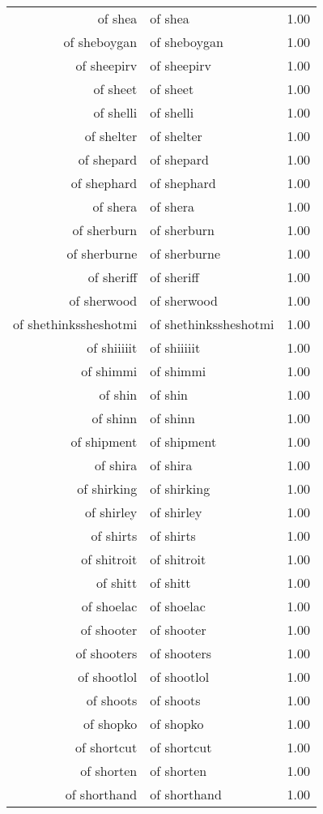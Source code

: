 \begin{table}[ht]
\begin{tabular}{rlr}
  of shea & of shea & 1.00 \\ 
  of sheboygan & of sheboygan & 1.00 \\ 
  of sheepirv & of sheepirv & 1.00 \\ 
  of sheet & of sheet & 1.00 \\ 
  of shelli & of shelli & 1.00 \\ 
  of shelter & of shelter & 1.00 \\ 
  of shepard & of shepard & 1.00 \\ 
  of shephard & of shephard & 1.00 \\ 
  of shera & of shera & 1.00 \\ 
  of sherburn & of sherburn & 1.00 \\ 
  of sherburne & of sherburne & 1.00 \\ 
  of sheriff & of sheriff & 1.00 \\ 
  of sherwood & of sherwood & 1.00 \\ 
  of shethinkssheshotmi & of shethinkssheshotmi & 1.00 \\ 
  of shiiiiit & of shiiiiit & 1.00 \\ 
  of shimmi & of shimmi & 1.00 \\ 
  of shin & of shin & 1.00 \\ 
  of shinn & of shinn & 1.00 \\ 
  of shipment & of shipment & 1.00 \\ 
  of shira & of shira & 1.00 \\ 
  of shirking & of shirking & 1.00 \\ 
  of shirley & of shirley & 1.00 \\ 
  of shirts & of shirts & 1.00 \\ 
  of shitroit & of shitroit & 1.00 \\ 
  of shitt & of shitt & 1.00 \\ 
  of shoelac & of shoelac & 1.00 \\ 
  of shooter & of shooter & 1.00 \\ 
  of shooters & of shooters & 1.00 \\ 
  of shootlol & of shootlol & 1.00 \\ 
  of shoots & of shoots & 1.00 \\ 
  of shopko & of shopko & 1.00 \\ 
  of shortcut & of shortcut & 1.00 \\ 
  of shorten & of shorten & 1.00 \\ 
  of shorthand & of shorthand & 1.00 \\ 

\end{tabular}
\end{table}
